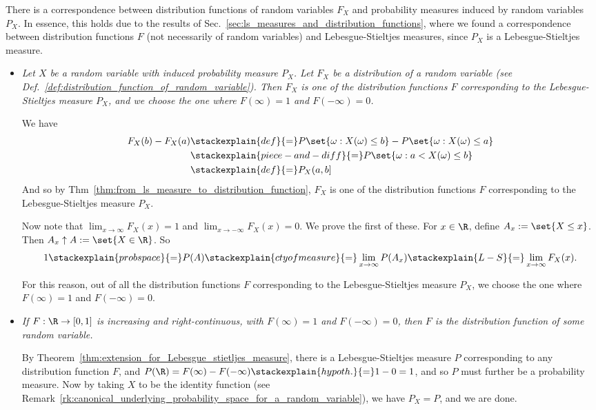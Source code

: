 \documentclass{article} %
\begin{document}
 
 \begin{remark}{}
There is a correspondence between distribution functions of random variables $F_X$ and probability measures induced by random variables $P_X$.  In essence, this holds due to the results of Sec.~\ref{sec:ls_measures_and_distribution_functions}, where we found a correspondence between distribution functions $F$ (not necessarily of random variables) and Lebesgue-Stieltjes measures, since $P_X$ is a Lebesgue-Stieltjes measure. 
\begin{itemize}
\item \textit{Let $X$ be a random variable with induced probability measure $P_X$.  Let $F_X$ be a distribution of a random variable (see Def.~\ref{def:distribution_function_of_random_variable}).   Then $F_X$ is one of the distribution functions $F$ corresponding to the Lebesgue-Stieltjes measure $P_X$, and we choose the one where $F(\infty)=1$ and $F(-\infty)=0$.} 

We have
\begin{align*}
F_X(b)-F_X(a) &\stackexplain{def}{=} P \set{\omega : X(\omega) \leq b} - P\set{\omega : X(\omega) \leq a} \\
& \stackexplain{piece-and-diff}{=} P\set{\omega : a < X(\omega) \leq b} \\
&\stackexplain{def}{=} P_X(a,b]
\end{align*}
And so by Thm~\ref{thm:from_ls_measure_to_distribution_function}, $F_X$ is one of the distribution functions $F$ corresponding to the Lebesgue-Stieltjes measure $P_X$. 

Now note that $\lim_{x \to \infty} F_X(x) =1$ and $\lim_{x \to -\infty} F_X(x) =0$. We prove the first of these. For $x \in \R$, define $A_x := \set{X \leq x}$. Then $A_x \uparrow A := \set{X \in \R}$. So
\[ 1 \stackexplain{prob space}{=} P(A) \stackexplain{cty of measure}{=} \lim_{x \to \infty} P(A_x) \stackexplain{L-S}{=} \lim_{x \to \infty} F_X(x).   \]
 
For this reason, out of all the distribution functions $F$ corresponding to the Lebesgue-Stieltjes measure $P_X$, we choose the one where $F(\infty)=1$ and $F(-\infty)=0$.
\item \textit{If $F: \R \to [0,1]$ is increasing and right-continuous, with $F(\infty)=1$ and $F(-\infty)=0$, then $F$ is the distribution function of some random variable.}

By Theorem~\ref{thm:extension_for_Lebesgue_stietljes_measure}, there is a Lebesgue-Stieltjes measure $P$ corresponding to any distribution function $F$,  and $P(\R) = F(\infty) - F(-\infty) \stackexplain{hypoth.}{=} 1 - 0 = 1$, and so $P$ must further be a probability measure.   Now by taking $X$ to be the identity function (see Remark~\ref{rk:canonical_underlying_probability_space_for_a_random_variable}), we have $P_X =P$, and we are done.  
\end{itemize}
\label{rk:correspondence_between_distribution_functions_of_random_variables_and_probability_measures_induced_by_random_variables}
\end{remark}
\end{document}
